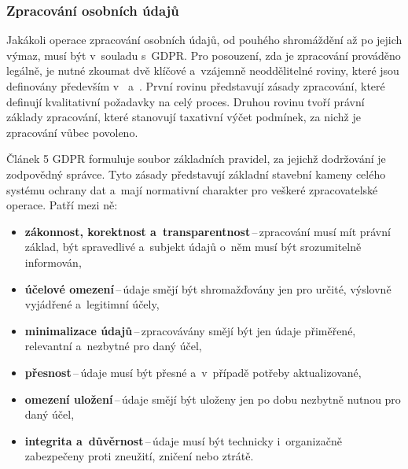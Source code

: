 \subsubsection*{Zpracování osobních údajů}
\label{sec:gdpr-data-processing}
Jakákoli operace zpracování osobních údajů, od pouhého shromáždění až po jejich výmaz, musí být v~souladu s~GDPR.
Pro posouzení, zda je zpracování prováděno legálně, je nutné zkoumat dvě klíčové a~vzájemně neoddělitelné roviny, které jsou definovány především v~\cite[Článek 5]{eu-2016-679} a~\cite[Článek 6]{eu-2016-679}.
První rovinu představují zásady zpracování, které definují kvalitativní požadavky na celý proces.
Druhou rovinu tvoří právní základy zpracování, které stanovují taxativní výčet podmínek, za nichž je zpracování vůbec povoleno.

Článek 5 GDPR formuluje soubor základních pravidel, za jejichž dodržování je zodpovědný správce.
Tyto zásady představují základní stavební kameny celého systému ochrany dat a~mají normativní charakter pro veškeré zpracovatelské operace.
Patří mezi ně:
\begin{itemize}
    \item \textbf{zákonnost, korektnost a~transparentnost}\,--\,zpracování musí mít právní základ, být spravedlivé a~subjekt údajů o~něm musí být srozumitelně informován,
    \item \textbf{účelové omezení}\,--\,údaje smějí být shromažďovány jen pro určité, výslovně vyjádřené a~legitimní účely,
    \item \textbf{minimalizace údajů}\,--\,zpracovávány smějí být jen údaje přiměřené, relevantní a~nezbytné pro daný účel,
    \item \textbf{přesnost}\,--\,údaje musí být přesné a~v~případě potřeby aktualizované,
    \item \textbf{omezení uložení}\,--\,údaje smějí být uloženy jen po dobu nezbytně nutnou pro daný účel,
    \item \textbf{integrita a~důvěrnost}\,--\,údaje musí být technicky i~organizačně zabezpečeny proti zneužití, zničení nebo ztrátě.
\end{itemize}

